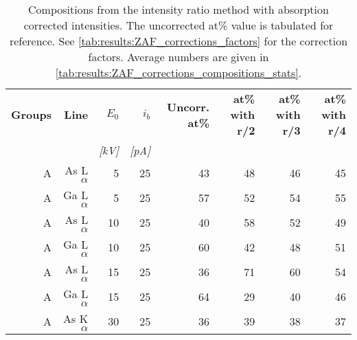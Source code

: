 \begin{table}[phtb]
    \begin{center}
        \caption{
            Compositions from the intensity ratio method with absorption corrected intensities. The uncorrected at\% value is tabulated for reference.
            See \cref{tab:results:ZAF_corrections_factors} for the correction factors.
            Average numbers are given in \cref{tab:results:ZAF_corrections_compositions_stats}.
        }
        \label{tab:results:ZAF_corrections_compositions}
        \begin{tabular}{rrrrrrrr}
            \hline
            \textbf{Groups} & \textbf{Line} & \textbf{$E_0$} & \textbf{$i_b$} & \textbf{Uncorr. at\%} & \textbf{at\% with r/2} & \textbf{at\% with r/3} & \textbf{at\% with r/4} \\
            \emph{}         & \emph{}       & \emph{[kV]}    & \emph{[pA]}    & \emph{}               & \emph{}                & \emph{}                & \emph{}                \\
            \hline
            A               & As L$\alpha$  & 5              & 25             & 43                    & 48                     & 46                     & 45                     \\
            A               & Ga L$\alpha$  & 5              & 25             & 57                    & 52                     & 54                     & 55                     \\
            A               & As L$\alpha$  & 10             & 25             & 40                    & 58                     & 52                     & 49                     \\
            A               & Ga L$\alpha$  & 10             & 25             & 60                    & 42                     & 48                     & 51                     \\
            A               & As L$\alpha$  & 15             & 25             & 36                    & 71                     & 60                     & 54                     \\
            A               & Ga L$\alpha$  & 15             & 25             & 64                    & 29                     & 40                     & 46                     \\
            A               & As K$\alpha$  & 30             & 25             & 36                    & 39                     & 38                     & 37                     \\

\end{tabular}
\end{center}
\end{table}
